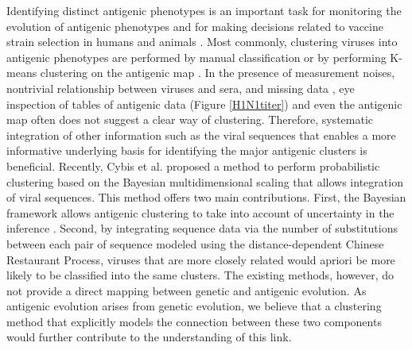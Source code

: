 \documentclass[11pt,oneside,letterpaper]{article}
\begin{document}
Identifying distinct antigenic phenotypes is an important task for monitoring the evolution of antigenic phenotypes and for making decisions related to vaccine strain selection in humans and animals \cite{smith_mapping_2004, jong_antigenic_2007, fouchier_use_2010}.
Most commonly, clustering viruses into antigenic phenotypes are performed by manual classification or by performing K-means clustering on the antigenic map \cite{smith_mapping_2004, ?}. 
In the presence of measurement noises, nontrivial relationship between viruses and sera, and missing data \cite{cai_computational_2010}, eye inspection of tables of antigenic data (Figure \ref{H1N1titer}) and even the antigenic map often does not suggest a clear way of clustering. 
Therefore, systematic integration of other information such as the viral sequences that enables a more informative underlying basis for identifying the major antigenic clusters is beneficial.
Recently, Cybis et al. \cite{ADD ARVIX} proposed a method to perform probabilistic clustering based on the Bayesian multidimensional scaling \cite{oh_bayesian_2001, bedford_integrating_2014} that allows integration of viral sequences. 
This method offers two main contributions. 
First, the Bayesian framework allows antigenic clustering to take into account of uncertainty in the inference \cite{bedford_integrating_2014}.
Second, by integrating sequence data via the number of substitutions between each pair of sequence modeled using the distance-dependent Chinese Restaurant Process, viruses that are more closely related would apriori be more likely to be classified into the same clusters. 
The existing methods, however, do not provide a direct mapping between genetic and antigenic evolution. 
As antigenic evolution arises from genetic evolution, we believe that a clustering method that explicitly models the connection between these two components would further contribute to the understanding of this link.
\end{document}
